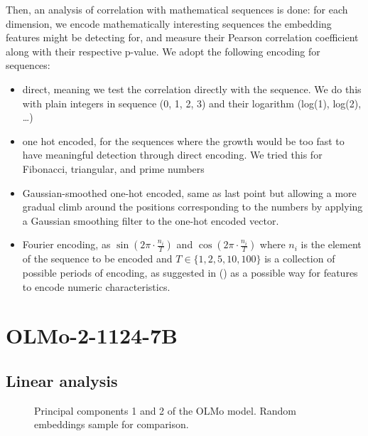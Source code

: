 \documentclass[
  a4paper, twoside, 10pt, titlepage]{book}
\makeatletter
\newcommand*\pandocbounded[1]{%
  \sbox\pandoc@box{#1}%
  \Gscale@div\@tempa{\textheight}{\dimexpr\ht\pandoc@box+\dp\pandoc@box\relax}%
  \Gscale@div\@tempb{\linewidth}{\wd\pandoc@box}%
  \ifdim\@tempb\p@<\@tempa\p@\let\@tempa\@tempb\fi%
  \ifdim\@tempa\p@<\p@\scalebox{\@tempa}{\usebox\pandoc@box}%
  \else\usebox{\pandoc@box}%
  \fi%
}
\makeatother
\begin{document}
Then, an analysis of correlation with mathematical sequences is done:
for each dimension, we encode mathematically interesting sequences the
embedding features might be detecting for, and measure their Pearson
correlation coefficient along with their respective p-value. We adopt
the following encoding for sequences:

\begin{itemize}
\item
  direct, meaning we test the correlation directly with the sequence. We
  do this with plain integers in sequence (0, 1, 2, 3) and their
  logarithm (log(1), log(2), \ldots)
\item
  one hot encoded, for the sequences where the growth would be too fast
  to have meaningful detection through direct encoding. We tried this
  for Fibonacci, triangular, and prime numbers
\item
  Gaussian-smoothed one-hot encoded, same as last point but allowing a
  more gradual climb around the positions corresponding to the numbers
  by applying a Gaussian smoothing filter to the one-hot encoded vector.
\item
  Fourier encoding, as \(\sin\left(2 \pi  \cdot \frac{n_i}T\right)\) and
  \(\cos\left(2 \pi
  \cdot \frac{n_i}T\right)\) where \(n_i\) is the element of the
  sequence to be encoded and \(T \in \{1, 2, 5, 10, 100\}\) is a
  collection of possible periods of encoding, as suggested in
  () as a
  possible way for features to encode numeric characteristics.
\end{itemize}

\clearpage

\section{OLMo-2-1124-7B}\label{olmo-2-1124-7b}

\subsection{Linear analysis}\label{linear-analysis}

\begin{figure}
\centering
\pandocbounded{}
\caption{Principal components 1 and 2 of the OLMo model. Random
embeddings sample for comparison.}\label{fig:olmo-pca}
\end{figure}
\end{document}
